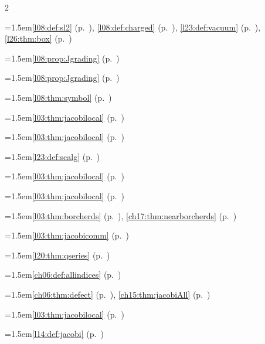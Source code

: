 \begin{multicols}{2}
\par{}\par\nopagebreak\smallskip
\hangindent=1.5em\quad \ref{l08:def:sl2} (p.~\pageref{l08:def:sl2}), \ref{l08:def:charged} (p.~\pageref{l08:def:charged}), \ref{l23:def:vacuum} (p.~\pageref{l23:def:vacuum}), \ref{l26:thm:box} (p.~\pageref{l26:thm:box})\par
\hangindent=1.5em\quad \ref{l08:prop:Jgrading} (p.~\pageref{l08:prop:Jgrading})\par
\hangindent=1.5em\quad \ref{l08:prop:Jgrading} (p.~\pageref{l08:prop:Jgrading})\par
\hangindent=1.5em\quad \ref{l08:thm:symbol} (p.~\pageref{l08:thm:symbol})\par
\hangindent=1.5em\quad \ref{l03:thm:jacobilocal} (p.~\pageref{l03:thm:jacobilocal})\par
\hangindent=1.5em\quad \ref{l03:thm:jacobilocal} (p.~\pageref{l03:thm:jacobilocal})\par
\hangindent=1.5em\quad \ref{l23:def:scalg} (p.~\pageref{l23:def:scalg})\par
\hangindent=1.5em\quad \ref{l03:thm:jacobilocal} (p.~\pageref{l03:thm:jacobilocal})\par
\hangindent=1.5em\quad \ref{l03:thm:jacobilocal} (p.~\pageref{l03:thm:jacobilocal})\par
\hangindent=1.5em\quad \ref{l03:thm:borcherds} (p.~\pageref{l03:thm:borcherds}), \ref{ch17:thm:nearborcherds} (p.~\pageref{ch17:thm:nearborcherds})\par
\hangindent=1.5em\quad \ref{l03:thm:jacobicomm} (p.~\pageref{l03:thm:jacobicomm})\par
\hangindent=1.5em\quad \ref{l20:thm:qseries} (p.~\pageref{l20:thm:qseries})\par
\hangindent=1.5em\quad \ref{ch06:def:allindices} (p.~\pageref{ch06:def:allindices})\par
\hangindent=1.5em\quad \ref{ch06:thm:defect} (p.~\pageref{ch06:thm:defect}), \ref{ch15:thm:jacobiAll} (p.~\pageref{ch15:thm:jacobiAll})\par
\hangindent=1.5em\quad \ref{l03:thm:jacobilocal} (p.~\pageref{l03:thm:jacobilocal})\par
\hangindent=1.5em\quad \ref{l14:def:jacobi} (p.~\pageref{l14:def:jacobi})\par

\end{multicols}
